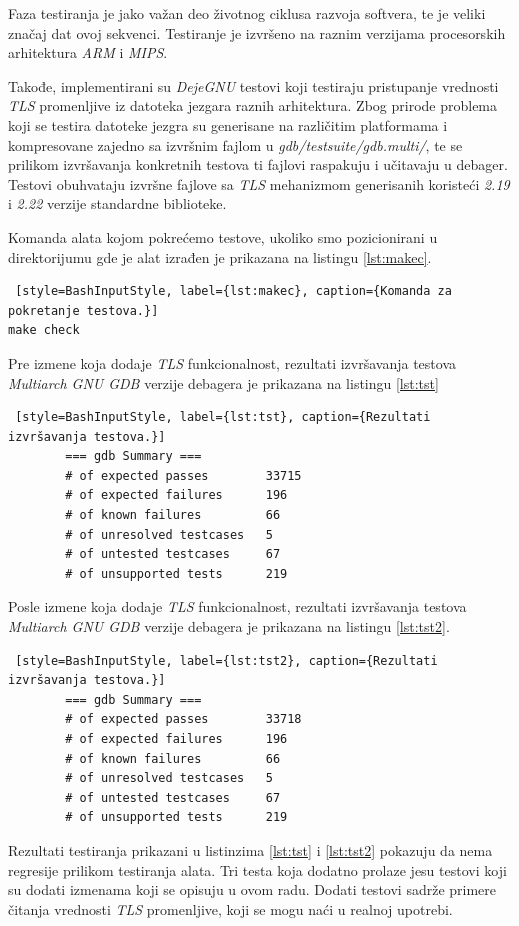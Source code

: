 \documentclass[12pt,oneside]{memoir}
\begin{document}
Faza testiranja je jako važan deo životnog ciklusa razvoja softvera, te je veliki značaj dat ovoj sekvenci. Testiranje je izvršeno na raznim verzijama procesorskih arhitektura \emph{ARM} i \emph{MIPS}.

Takođe, implementirani su \emph{DejeGNU} \cite{DejaGNU} testovi koji testiraju pristupanje vrednosti \emph{TLS} promenljive iz datoteka jezgara raznih arhitektura. Zbog prirode problema koji se testira datoteke jezgra su generisane na različitim platformama i kompresovane zajedno sa izvršnim fajlom u \emph{gdb/testsuite/gdb.multi/}, te se prilikom izvršavanja konkretnih testova ti fajlovi raspakuju i učitavaju u debager. Testovi obuhvataju izvršne fajlove sa \emph{TLS} mehanizmom generisanih koristeći \emph{2.19} i \emph{2.22} verzije standardne biblioteke.

Komanda alata kojom pokrećemo testove, ukoliko smo pozicionirani u direktorijumu gde je alat izrađen je prikazana na listingu \ref{lst:makec}.

\begin{lstlisting} [style=BashInputStyle, label={lst:makec}, caption={Komanda za pokretanje testova.}]
make check
\end{lstlisting}

Pre izmene koja dodaje \emph{TLS} funkcionalnost, rezultati izvršavanja testova \emph{Multiarch GNU GDB} verzije debagera je prikazana na listingu \ref{lst:tst}

\begin{lstlisting} [style=BashInputStyle, label={lst:tst}, caption={Rezultati izvršavanja testova.}]
		=== gdb Summary ===
		# of expected passes		33715
		# of expected failures		196
		# of known failures		    66
		# of unresolved testcases	5
		# of untested testcases		67
		# of unsupported tests		219
\end{lstlisting}
 
Posle izmene koja dodaje \emph{TLS} funkcionalnost, rezultati izvršavanja testova \emph{Multiarch GNU GDB} verzije debagera je prikazana na listingu \ref{lst:tst2}.

\begin{lstlisting} [style=BashInputStyle, label={lst:tst2}, caption={Rezultati izvršavanja testova.}]
		=== gdb Summary ===
		# of expected passes		33718
		# of expected failures		196
		# of known failures		    66
		# of unresolved testcases	5
		# of untested testcases		67
		# of unsupported tests		219
\end{lstlisting}

Rezultati testiranja prikazani u listinzima \ref{lst:tst} i \ref{lst:tst2} pokazuju da nema regresije prilikom testiranja alata. Tri testa koja dodatno prolaze jesu testovi koji su dodati izmenama koji se opisuju u ovom radu. Dodati testovi sadrže primere čitanja vrednosti \emph{TLS} promenljive, koji se mogu naći u realnoj upotrebi.
\end{document}
